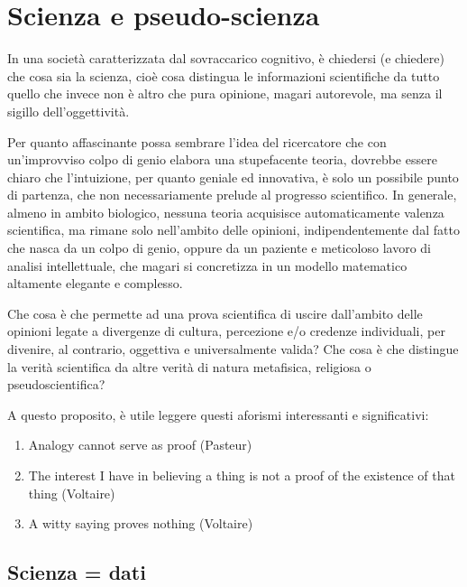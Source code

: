 \documentclass[
  12pt,
]{book}
\providecommand{\tightlist}{%
  \setlength{\itemsep}{0pt}\setlength{\parskip}{0pt}}
\begin{document}
\hypertarget{scienza-e-pseudo-scienza}{%
\chapter{Scienza e pseudo-scienza}\label{scienza-e-pseudo-scienza}}

In una società caratterizzata dal sovraccarico cognitivo, è chiedersi (e chiedere) che cosa sia la scienza, cioè cosa distingua le informazioni scientifiche da tutto quello che invece non è altro che pura opinione, magari autorevole, ma senza il sigillo dell'oggettività.

Per quanto affascinante possa sembrare l'idea del ricercatore che con un'improvviso colpo di genio elabora una stupefacente teoria, dovrebbe essere chiaro che l'intuizione, per quanto geniale ed innovativa, è solo un possibile punto di partenza, che non necessariamente prelude al progresso scientifico. In generale, almeno in ambito biologico, nessuna teoria acquisisce automaticamente valenza scientifica, ma rimane solo nell'ambito delle opinioni, indipendentemente dal fatto che nasca da un colpo di genio, oppure da un paziente e meticoloso lavoro di analisi intellettuale, che magari si concretizza in un modello matematico altamente elegante e complesso.

Che cosa è che permette ad una prova scientifica di uscire dall'ambito delle opinioni legate a divergenze di cultura, percezione e/o credenze individuali, per divenire, al contrario, oggettiva e universalmente valida? Che cosa è che distingue la verità scientifica da altre verità di natura metafisica, religiosa o pseudoscientifica?

A questo proposito, è utile leggere questi aforismi interessanti e significativi:

\begin{enumerate}
\def\labelenumi{\arabic{enumi}.}
\tightlist
\item
  Analogy cannot serve as proof (Pasteur)
\item
  The interest I have in believing a thing is not a proof of the existence of that thing (Voltaire)
\item
  A witty saying proves nothing (Voltaire)
\end{enumerate}

\hypertarget{scienza-dati}{%
\section{Scienza = dati}\label{scienza-dati}}
\end{document}
